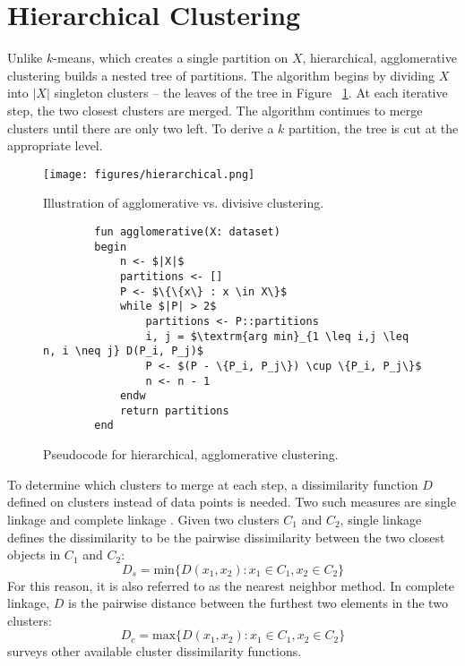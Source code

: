\section{Hierarchical Clustering}
Unlike $k$-means, which creates a single partition on $X$, hierarchical, agglomerative clustering builds a nested tree of partitions. The algorithm begins by dividing $X$ into $|X|$ singleton clusters -- the leaves of the tree in Figure ~\ref{fig:hierarchdiag}. At each iterative step, the two closest clusters are merged. The algorithm continues to merge clusters until there are only two left. To derive a $k$ partition, the tree is cut at the appropriate level.
\begin{figure}
	\centerline{\texttt{[image: figures/hierarchical.png]}}
	\caption{Illustration of agglomerative vs. divisive clustering.}
	\label{fig:hierarchdiag}
\end{figure}
\begin{figure}
	\begin{lstlisting}
		fun agglomerative(X: dataset)
		begin
			n <- $|X|$
			partitions <- []
			P <- $\{\{x\} : x \in X\}$
			while $|P| > 2$
				partitions <- P::partitions
				i, j = $\textrm{arg min}_{1 \leq i,j \leq n, i \neq j} D(P_i, P_j)$
				P <- $(P - \{P_i, P_j\}) \cup \{P_i, P_j\}$
				n <- n - 1
			endw
			return partitions
		end
	\end{lstlisting}
	\caption{Pseudocode for hierarchical, agglomerative clustering.}
	\label{fig:hierarchcode}
\end{figure}

To determine which clusters to merge at each step, a dissimilarity function $D$ defined on clusters instead of data points is needed. Two such measures are single linkage and complete linkage \citep{gan2007}. Given two clusters $C_1$ and $C_2$, single linkage defines the dissimilarity to be the pairwise dissimilarity between the two closest objects in $C_1$ and $C_2$:
\[D_s = \textrm{min} \{D(x_1, x_2): x_1 \in C_1, x_2 \in C_2\}\]
For this reason, it is also referred to as the nearest neighbor method. In complete linkage, $D$ is the pairwise distance between the furthest two elements in the two clusters:
\[D_c = \textrm{max} \{D(x_1, x_2): x_1 \in C_1, x_2 \in C_2\}\]
\citeauthor{gan2007} surveys other available cluster dissimilarity functions.


